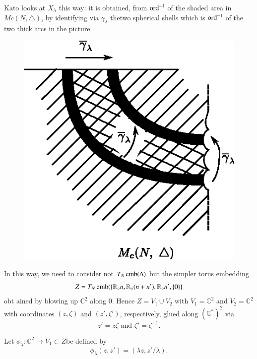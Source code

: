 \begin{remark*}
Kato \cite{keyK2} looks at $X_{\lambda}$ this way: it is obtained, from
$\operatorname{ord}^{-1}$ of the shaded area in $Mc(N, \triangle)$, by identifying
via $\gamma_\lambda$ the\pageoriginale two spherical shells which is
$\operatorname{ord}^{-1}$ of the two thick arcs in the picture.     
 \begin{figure}[H]
\centering 
\includegraphics{vol58-fig/fig58-73.eps} 
\end{figure}
\end{remark*}
 
In this way, we need to consider not $T_N \operatorname{emb} (\Delta)$ but the
simpler torus  embedding 	 
$$
Z= T_N \operatorname{emb}(\{\mathbb{R}_\circ n, \mathbb{R}_\circ (n+n'),
\mathbb{R}_\circ n', \{0\}\}  
$$ 
obt ained by  blowing up $\mathbb{C}^2$ along 0.  Hence $Z=V_1 \cup
V_2$ with $V_1 =\mathbb{C}^2$ and $ V_2 =\mathbb{C}^2$  with
coordinates $(z, \zeta)$ and $(z' ,\zeta')$, respectively, glued along
$(\mathbb{C}^*)^2$  via  
    $$
    z'=z \zeta \text{ and } \zeta' = \zeta^{-1}.
    $$
    
    Let $\phi_\lambda : \mathbb{C}^2 \to V_1 \subset Z$be defined by 
    $$
    \phi_\lambda (z, z')= (\lambda z, z' / \lambda).
    $$
    
